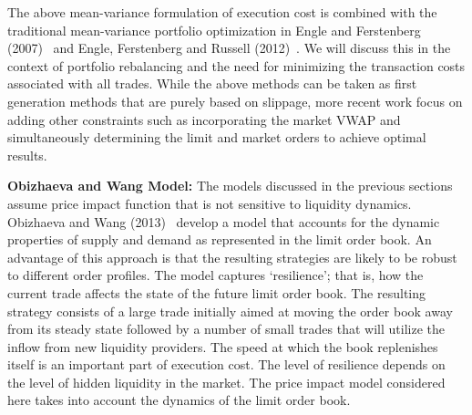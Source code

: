 The above mean-variance formulation of execution cost is combined with the traditional mean-variance portfolio optimization in Engle and Ferstenberg (2007)~\cite{engle2007} and Engle, Ferstenberg and Russell (2012)~\cite{engle2012}. We will discuss this in the context of portfolio rebalancing and the need for minimizing the transaction costs associated with all trades. While the above methods can be taken as first generation methods that are purely based on slippage, more recent work focus on adding other constraints such as incorporating the market VWAP and simultaneously determining the limit and market orders to achieve optimal results. \twomedskip


\noindent\textbf{Obizhaeva and Wang Model:} The models discussed in the previous sections assume price impact function that is not sensitive to liquidity dynamics. Obizhaeva and Wang (2013)~\cite{obizhaeva} develop a model that accounts for the dynamic properties of supply and demand as represented in the limit order book. An advantage of this approach is that the resulting strategies are likely to be robust to different order profiles. The model captures `resilience'; that is, how the current trade affects the state of the future limit order book. The resulting strategy consists of a large trade initially aimed at moving the order book away from its steady state followed by a number of small trades that will utilize the inflow from new liquidity providers. The speed at which the book replenishes itself is an important part of execution cost. The level of resilience depends on the level of hidden liquidity in the market. The price impact model considered here takes into account the dynamics of the limit order book.


